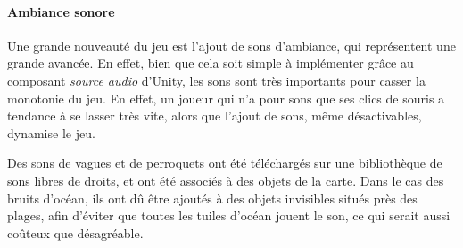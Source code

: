     \paragraph{Ambiance sonore}

    Une grande nouveauté du jeu est l'ajout de sons d'ambiance, qui représentent une grande avancée. En effet, bien que cela soit 
    simple à implémenter grâce au composant \textit{source audio} d'Unity, les sons sont très importants pour casser 
    la monotonie du jeu. En effet, un joueur qui n'a pour sons que ses clics de souris a tendance à se lasser très vite, alors 
    que l'ajout de sons, même désactivables, dynamise le jeu.

    Des sons de vagues et de perroquets ont été téléchargés sur une bibliothèque de sons libres de droits, et ont été associés 
    à des objets de la carte. Dans le cas des bruits d'océan, ils ont dû être ajoutés à des objets invisibles situés près des 
    plages, afin d'éviter que toutes les tuiles d'océan jouent le son, ce qui serait aussi coûteux que désagréable. 
